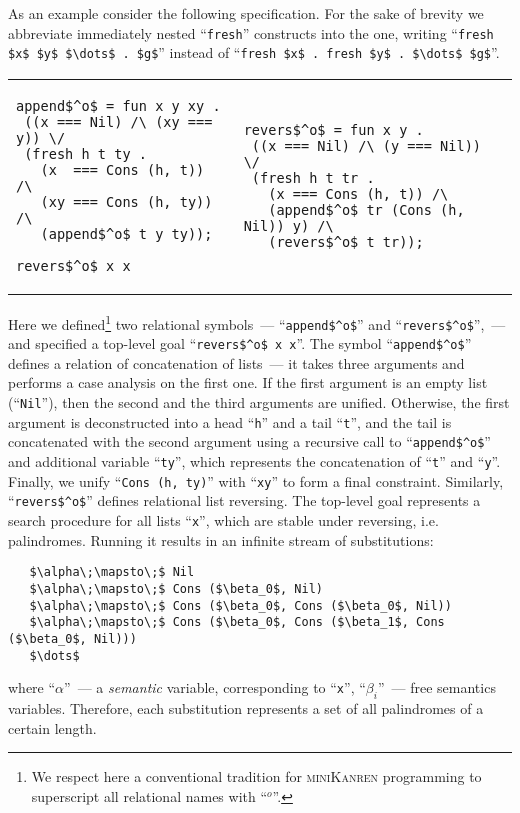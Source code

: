 As an example consider the following specification. For the sake of brevity we
abbreviate immediately nested ``\lstinline|fresh|'' constructs into the one, writing ``\lstinline|fresh $x$ $y$ $\dots$ . $g$|'' instead of
``\lstinline|fresh $x$ . fresh $y$ . $\dots$ $g$|''.

\begin{tabular}{p{5.5cm}p{5.5cm}}
\begin{lstlisting}
append$^o$ = fun x y xy .
 ((x === Nil) /\ (xy === y)) \/
 (fresh h t ty .
   (x  === Cons (h, t))  /\
   (xy === Cons (h, ty)) /\
   (append$^o$ t y ty));

revers$^o$ x x
\end{lstlisting} &
\begin{lstlisting}
revers$^o$ = fun x y .
 ((x === Nil) /\ (y === Nil)) \/
 (fresh h t tr .
   (x === Cons (h, t)) /\
   (append$^o$ tr (Cons (h, Nil)) y) /\
   (revers$^o$ t tr));
\end{lstlisting}
\end{tabular}

Here we defined\footnote{We respect here a conventional tradition for \textsc{miniKanren} programming to superscript all relational names with ``$^o$''.}
two relational symbols~--- ``\lstinline|append$^o$|'' and ``\lstinline|revers$^o$|'',~--- and specified a top-level goal ``\lstinline|revers$^o$ x x|''.
The symbol ``\lstinline|append$^o$|'' defines a relation of concatenation of lists~--- it takes three arguments and performs a case analysis on the first one. If the
first argument is an empty list (``\lstinline|Nil|''), then the second and the third arguments are unified. Otherwise, the first argument is deconstructed into a head ``\lstinline|h|''
and a tail ``\lstinline|t|'', and the tail is concatenated with the second argument using a recursive call to ``\lstinline|append$^o$|'' and additional variable ``\lstinline|ty|'', which
represents the concatenation of ``\lstinline|t|'' and ``\lstinline|y|''. Finally, we unify ``\lstinline|Cons (h, ty)|'' with ``\lstinline|xy|'' to form a final constraint. Similarly,
``\lstinline|revers$^o$|'' defines relational list reversing. The top-level goal represents a search procedure for all lists ``\lstinline|x|'', which are stable under reversing, i.e.
palindromes. Running it results in an infinite stream of substitutions:

\begin{lstlisting}
   $\alpha\;\mapsto\;$ Nil
   $\alpha\;\mapsto\;$ Cons ($\beta_0$, Nil)
   $\alpha\;\mapsto\;$ Cons ($\beta_0$, Cons ($\beta_0$, Nil))
   $\alpha\;\mapsto\;$ Cons ($\beta_0$, Cons ($\beta_1$, Cons ($\beta_0$, Nil)))
   $\dots$
\end{lstlisting}

where ``$\alpha$''~--- a \emph{semantic} variable, corresponding to ``\lstinline|x|'', ``$\beta_i$''~--- free semantics variables. Therefore, each substitution represents a set of all palindromes of a certain length.

